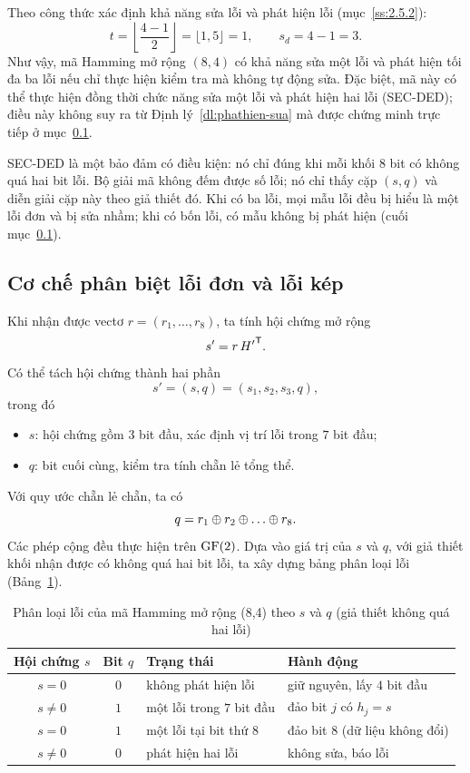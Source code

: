 Theo công thức xác định khả năng sửa lỗi và phát hiện lỗi (mục~\ref{ss:2.5.2}):
\[
  t = \left\lfloor \frac{4 - 1}{2} \right\rfloor = \lfloor 1{,}5 \rfloor = 1,
  \qquad
  s_d = 4 - 1 = 3 .
\]
Như vậy, mã Hamming mở rộng $(8,4)$ có khả năng sửa một lỗi và phát hiện tối
đa ba lỗi nếu chỉ thực hiện kiểm tra mà không tự động sửa. Đặc biệt, mã này có
thể thực hiện đồng thời chức năng sửa một lỗi và phát hiện hai lỗi (SEC-DED);
điều này không suy ra từ Định lý~\ref{dl:phathien-sua} mà được chứng minh trực
tiếp ở mục~\ref{ss:2.7.3}.

\begin{luuy}
SEC-DED là một bảo đảm có điều kiện: nó chỉ đúng khi mỗi khối $8$ bit có không
quá hai bit lỗi. Bộ giải mã không đếm được số lỗi; nó chỉ thấy cặp $(s, q)$ và
diễn giải cặp này theo giả thiết đó. Khi có ba lỗi, mọi mẫu lỗi đều bị hiểu là
một lỗi đơn và bị sửa nhầm; khi có bốn lỗi, có mẫu không bị phát hiện (cuối
mục~\ref{ss:2.7.3}).
\end{luuy}

\subsection{Cơ chế phân biệt lỗi đơn và lỗi kép}
\label{ss:2.7.3}

Khi nhận được vectơ $r = (r_1, \dots, r_8)$, ta tính hội chứng mở rộng
\[
  s' = r\,{H'}^{\mathsf{T}} .
\]
Có thể tách hội chứng thành hai phần
\[
  s' = (s, q) = (s_1, s_2, s_3, q),
\]
trong đó
\begin{itemize}
  \item $s$: hội chứng gồm $3$ bit đầu, xác định vị trí lỗi trong $7$ bit đầu;
  \item $q$: bit cuối cùng, kiểm tra tính chẵn lẻ tổng thể.
\end{itemize}
Với quy ước chẵn lẻ chẵn, ta có
\[
  q = r_1 \xor r_2 \xor \dots \xor r_8 .
\]
Các phép cộng đều thực hiện trên $\mathrm{GF}(2)$. Dựa vào giá trị của $s$ và $q$, với giả
thiết khối nhận được có không quá hai bit lỗi, ta xây dựng bảng phân loại lỗi
(Bảng~\ref{tab:84}).

\begin{table}[H]
\centering\small\renewcommand{\arraystretch}{1.1}
\caption{Phân loại lỗi của mã Hamming mở rộng (8,4) theo $s$ và $q$ (giả thiết không quá hai lỗi)}
\label{tab:84}
\begin{tabular}{|c|c|l|l|}
\hline
\textbf{Hội chứng} $s$ & \textbf{Bit} $q$ & \textbf{Trạng thái} & \textbf{Hành động}\\ \hline
$s = 0$ & $0$ & không phát hiện lỗi & giữ nguyên, lấy $4$ bit đầu\\ \hline
$s \neq 0$ & $1$ & một lỗi trong $7$ bit đầu & đảo bit $j$ có $h_j = s$\\ \hline
$s = 0$ & $1$ & một lỗi tại bit thứ $8$ & đảo bit $8$ (dữ liệu không đổi)\\ \hline
$s \neq 0$ & $0$ & phát hiện hai lỗi & không sửa, báo lỗi\\ \hline
\end{tabular}
\end{table}

